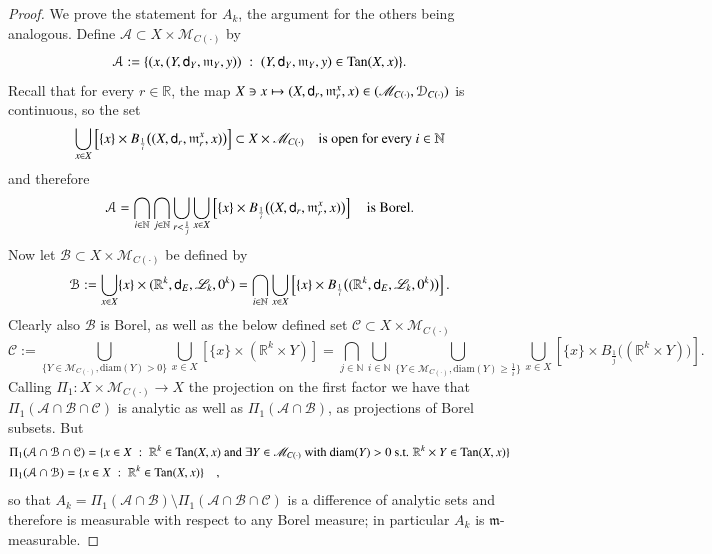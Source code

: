 \documentclass[11pt,reqno]{amsart}
\newcommand{\MM}{\mathscr{M}}
\newcommand{\diam}{\text{diam}}
\newcommand{\mm}{\mathfrak m}
\newcommand{\sfd}{{\sf d}}
\newcommand{\LL}{\mathscr{L}}
\newcommand{\R}{\mathbb{R}}
\newcommand{\N}{\mathbb{N}}
\newcommand{\Tan}{{\rm Tan}}
\theoremstyle{definition}
\theoremstyle{remark}
\theoremstyle{remark}
\theoremstyle{remark}
\theoremstyle{remark}
\theoremstyle{remark}
\theoremstyle{remark}
\theoremstyle{remark}
\begin{document}
\begin{proof}
We prove the statement for $A_k$, the argument for the others being analogous.
Define ${\mathcal A}\subset X \times \MM_{C(\cdot)}$ by
\begin{equation}\label{eq:defcalA}
{\mathcal A}:= \{(x,(Y,\sfd_Y,\mm_Y, y)) \; : \; (Y,\sfd_Y,\mm_Y, y) \in \Tan(X,x)\}. 
\end{equation}
Recall that for every $r\in \R$, the map $X\ni x \mapsto (X, \sfd_r, \mm^x_r, x) \in (\MM_{C(\cdot)}, \mathcal D_{C(\cdot)})$ is continuous, so the set 
$$\bigcup_{x \in X} \left[ \{x\}\times B_{\frac{1}{i}} \big( (X, \sfd_r, \mm^x_r, x) \big) \right] \subset X\times  \MM_{C(\cdot)} \quad \text{is open for every } i\in \N$$
and therefore
$${\mathcal A}= \bigcap_{i \in \N} \bigcap_{j \in \N}  \bigcup_{r<\frac{1}{j}} \bigcup_{x \in X}   \left[ \{x\}\times B_{\frac{1}{i}} \big( (X, \sfd_r, \mm^x_r, x) \big) \right] \quad \text{is Borel}. $$
Now let ${\mathcal B}\subset X \times \MM_{C(\cdot)}$ be defined by 
$${\mathcal B}:=\bigcup_{x \in X} \{x\}\times (\R^k,\sfd_E,\LL_k,0^k) =\bigcap_{i \in \N}  \bigcup_{x \in X} \left[ \{x\}\times  B_{\frac{1}{i}} \big((\R^k,\sfd_E,\LL_k,0^k)\big)  \right].$$
Clearly also ${\mathcal B}$ is Borel, as well as the below defined set ${\mathcal C}\subset X \times \MM_{C(\cdot)}$ 
$${\mathcal C}:=\bigcup_{\{Y\in  \MM_{C(\cdot)}, \diam(Y)>0 \}} \bigcup_{x \in X} \left[ \{x\}\times (\R^k \times Y)  \right] =\bigcap_{j \in \N} \bigcup_{i \in \N} \bigcup_{\{Y\in  \MM_{C(\cdot)}, \diam(Y)\geq \frac{1}{i} \}} \bigcup_{x \in X} \left[ \{x\}\times B_{\frac{1}{j}}
\big( (\R^k \times Y)  \big) \right] .$$
Calling $\Pi_1: X\times \MM_{C(\cdot)}\to X$ the projection on the first factor we have that $\Pi_1({\mathcal A}\cap {\mathcal B} \cap {\mathcal C})$ is analytic as well as $\Pi_1({\mathcal A}\cap {\mathcal B})$, as projections of Borel subsets. But 
\begin{eqnarray}
&\Pi_1({\mathcal A}\cap {\mathcal B} \cap {\mathcal C})=\{x \in X\;:\; \R^k \in \Tan(X,x) \text{ and } \exists Y\in \MM_{C(\cdot)} \text{ with } \diam(Y)>0 \text{ s.t. } \R^k \times Y \in \Tan(X,x) \}  \nonumber \\
&\Pi_1({\mathcal A}\cap {\mathcal B})=\{x \in X\;:\; \R^k \in \Tan(X,x) \}  \quad, \nonumber
\end{eqnarray}
so that $A_k=\Pi_1({\mathcal A}\cap {\mathcal B})\setminus \Pi_1({\mathcal A}\cap {\mathcal B} \cap {\mathcal C})$ is a difference of analytic sets and therefore is measurable with respect to any Borel measure; in particular $A_k$ is $\mm$-measurable.
\end{proof}
\end{document}
